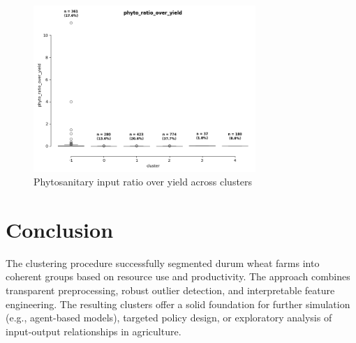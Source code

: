 \documentclass[a4paper,12pt]{article}
\begin{document}
\begin{figure}[h!]
    \centering
    \includegraphics[width=0.75\textwidth]{clustering_pipeline/output/20250404_boxplot_phyto_ratio_over_yield.png}
    \caption{Phytosanitary input ratio over yield across clusters}
\end{figure}

\clearpage

\section{Conclusion}

The clustering procedure successfully segmented durum wheat farms into coherent groups based on resource use and productivity. The approach combines transparent preprocessing, robust outlier detection, and interpretable feature engineering. The resulting clusters offer a solid foundation for further simulation (e.g., agent-based models), targeted policy design, or exploratory analysis of input-output relationships in agriculture.
\end{document}
